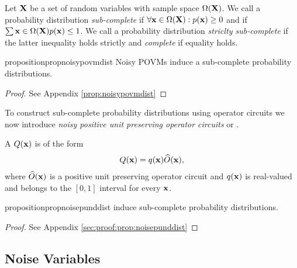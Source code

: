 \begin{definition}
	Let $\mathbf{X}$ be a set of random variables with sample space $\Omega(\mathbf{X})$. We call a probability distribution \textit{sub-complete} if $\forall \mathbf{x} \in \Omega(\mathbf{X}): p(\mathbf{x})\geq 0$ and if $\sum{\ensuremath{\mathbf{x}}\in \Omega(\ensuremath{\mathbf{X}})} p(\mathbf{x})\leq 1$. We call a probability distribution \textit{striclty sub-complete} if the latter inequality holds strictly and \textit{complete} if equality holds.
\end{definition}




\begin{restatable}{proposition}{propnoisypovmdist}
	\label{prop:noisypovmdist}
	Noisy POVMs induce a sub-complete probability distributions.
\end{restatable}


\begin{proof}
	See Appendix \ref{prop:noisypovmdist}
\end{proof}



To construct sub-complete probability distributions using operator circuits we now introduce \textit{noisy positive unit preserving operator circuits} or \noisepuncs.

\begin{definition}
	\label{def:noisepunc}
	A \noisepunc $Q(\mathbf{x})$ is of the form
	\begin{align}
		Q(\mathbf{x})= q(\mathbf{x}) \widehat{O}(\mathbf{x}),
	\end{align}
	where $\widehat{O}(\mathbf{x})$ is a positive unit preserving operator circuit and $q(\mathbf{x})$ is real-valued and belongs to the  $[0,1]$ interval for every $\mathbf{x}$.
\end{definition}



\begin{restatable}{proposition}{propnoisepunddist}
	\label{prop:noisepunddist}
	\noisepuncs induce sub-complete probability distributions.
\end{restatable}

\begin{proof}
	See Appendix \ref{sec:proof:prop:noisepunddist}
\end{proof}




\subsection{Noise Variables}


